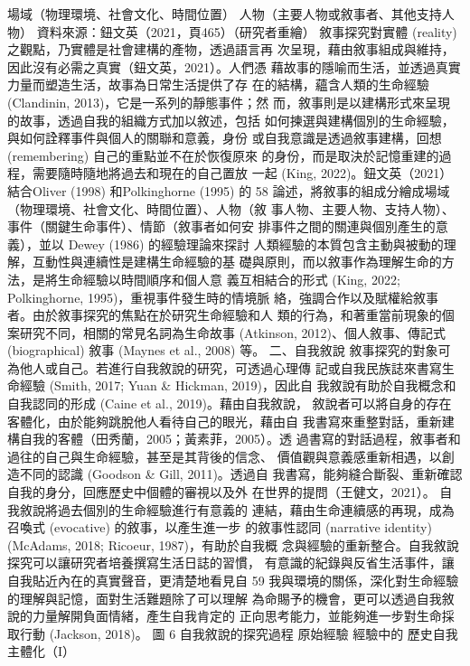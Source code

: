 場域（物理環境、社會文化、時間位置）
人物（主要人物或敘事者、其他支持人物）
資料來源：鈕文英（2021，頁465）（研究者重繪） 
敘事探究對實體 (reality) 之觀點，乃實體是社會建構的產物，透過語言再
次呈現，藉由敘事組成與維持，因此沒有必需之真實（鈕文英，2021）。人們憑
藉故事的隱喻而生活，並透過真實力量而塑造生活，故事為日常生活提供了存
在的結構，蘊含人類的生命經驗 (Clandinin, 2013)，它是一系列的靜態事件；然
而，敘事則是以建構形式來呈現的故事，透過自我的組織方式加以敘述，包括
如何揀選與建構個別的生命經驗，與如何詮釋事件與個人的關聯和意義，身份
或自我意識是透過敘事建構，回想 (remembering) 自己的重點並不在於恢復原來
的身份，而是取決於記憶重建的過程，需要隨時隨地將過去和現在的自己置放
一起 (King, 2022)。鈕文英（2021）結合Oliver (1998) 和Polkinghorne (1995) 的
58 
論述，將敘事的組成分繪成場域（物理環境、社會文化、時間位置）、人物（敘
事人物、主要人物、支持人物）、事件（關鍵生命事件）、情節（敘事者如何安
排事件之間的關連與個別產生的意義），並以 Dewey (1986) 的經驗理論來探討
人類經驗的本質包含主動與被動的理解，互動性與連續性是建構生命經驗的基
礎與原則，而以敘事作為理解生命的方法，是將生命經驗以時間順序和個人意
義互相結合的形式 (King, 2022; Polkinghorne, 1995)，重視事件發生時的情境脈
絡，強調合作以及賦權給敘事者。由於敘事探究的焦點在於研究生命經驗和人
類的行為，和著重當前現象的個案研究不同，相關的常見名詞為生命故事 
(Atkinson, 2012)、個人敘事、傳記式 (biographical) 敘事 (Maynes et al., 2008) 等。 
二、自我敘說 
敘事探究的對象可為他人或自己。若進行自我敘說的研究，可透過心理傳
記或自我民族誌來書寫生命經驗 (Smith, 2017; Yuan & Hickman, 2019)，因此自
我敘說有助於自我概念和自我認同的形成 (Caine et al., 2019)。藉由自我敘說，
敘說者可以將自身的存在客體化，由於能夠跳脫他人看待自己的眼光，藉由自
我書寫來重整對話，重新建構自我的客體（田秀蘭，2005；黃素菲，2005）。透
過書寫的對話過程，敘事者和過往的自己與生命經驗，甚至是其背後的信念、
價值觀與意義感重新相遇，以創造不同的認識 (Goodson & Gill, 2011)。透過自
我書寫，能夠縫合斷裂、重新確認自我的身分，回應歷史中個體的審視以及外
在世界的提問（王健文，2021）。 自我敘說將過去個別的生命經驗進行有意義的
連結，藉由生命連續感的再現，成為召喚式 (evocative) 的敘事，以產生進一步
的敘事性認同 (narrative identity) (McAdams, 2018; Ricoeur, 1987)，有助於自我概
念與經驗的重新整合。自我敘說探究可以讓研究者培養撰寫生活日誌的習慣，
有意識的紀錄與反省生活事件，讓自我貼近內在的真實聲音，更清楚地看見自
59 
我與環境的關係，深化對生命經驗的理解與記憶，面對生活難題除了可以理解
為命賜予的機會，更可以透過自我敘說的力量解開負面情緒，產生自我肯定的
正向思考能力，並能夠進一步對生命採取行動 (Jackson, 2018)。 
圖 6  
自我敘說的探究過程 
原始經驗
經驗中的
歷史自我
主體化（I）
